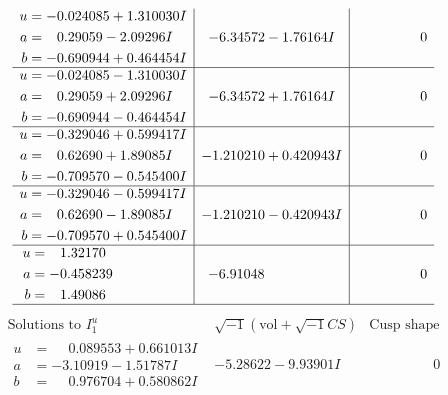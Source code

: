 \documentclass[1p]{elsarticle_modified}
\theoremstyle{definition}
\newcommand{\I}{\sqrt{-1}}
\begin{document}
$$\begin{array}{c|c|c}
\begin{aligned}
u &= -0.024085 + 1.310030 I \\
a &= \phantom{-}0.29059 - 2.09296 I \\
b &= -0.690944 + 0.464454 I\end{aligned}
 & -6.34572 - 1.76164 I & \phantom{-0.000000 } 0 \\ \hline\begin{aligned}
u &= -0.024085 - 1.310030 I \\
a &= \phantom{-}0.29059 + 2.09296 I \\
b &= -0.690944 - 0.464454 I\end{aligned}
 & -6.34572 + 1.76164 I & \phantom{-0.000000 } 0 \\ \hline\begin{aligned}
u &= -0.329046 + 0.599417 I \\
a &= \phantom{-}0.62690 + 1.89085 I \\
b &= -0.709570 - 0.545400 I\end{aligned}
 & -1.210210 + 0.420943 I & \phantom{-0.000000 } 0 \\ \hline\begin{aligned}
u &= -0.329046 - 0.599417 I \\
a &= \phantom{-}0.62690 - 1.89085 I \\
b &= -0.709570 + 0.545400 I\end{aligned}
 & -1.210210 - 0.420943 I & \phantom{-0.000000 } 0 \\ \hline\begin{aligned}
u &= \phantom{-}1.32170\phantom{ +0.000000I} \\
a &= -0.458239\phantom{ +0.000000I} \\
b &= \phantom{-}1.49086\phantom{ +0.000000I}\end{aligned}
 & -6.91048\phantom{ +0.000000I} & \phantom{-0.000000 } 0\\
 \hline 
 \end{array}$$\newpage$$\begin{array}{c|c|c}  
\text{Solutions to }I^u_{1}& \I (\text{vol} + \sqrt{-1}CS) & \text{Cusp shape}\\
 \hline 
\begin{aligned}
u &= \phantom{-}0.089553 + 0.661013 I \\
a &= -3.10919 - 1.51787 I \\
b &= \phantom{-}0.976704 + 0.580862 I\end{aligned}
 & -5.28622 - 9.93901 I & \phantom{-0.000000 } 0 \\ \hline\begin{aligned}

\end{aligned}
\end{array}$$
\end{document}
